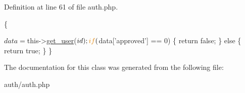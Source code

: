 Definition at line 61 of file auth.\-php.


\begin{DoxyCode}
                                         \{

        $data = $this->\hyperlink{classauth_aebf5c1995f3314883dc475628db61ccc}{get\_user}($id);
        \textcolor{keywordflow}{if} ($data[\textcolor{stringliteral}{'approved'}] == 0) \{
            \textcolor{keywordflow}{return} \textcolor{keyword}{false};
        \} \textcolor{keywordflow}{else} \{
            \textcolor{keywordflow}{return} \textcolor{keyword}{true};
        \}
    \}
\end{DoxyCode}


The documentation for this class was generated from the following file\-:\begin{DoxyCompactItemize}
\item 
auth/auth.\-php\end{DoxyCompactItemize}
